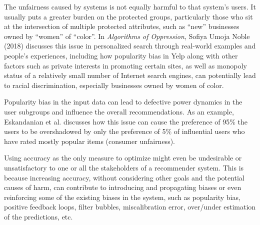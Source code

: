The unfairness caused by systems is not equally harmful to that system's users. It usually puts a greater burden on the protected groups, particularly those who sit at the intersection of multiple protected attributes, such as ``new'' businesses owned by ``women'' of ``color''. In \textit{Algorithms of Oppression}, Sofiya Umoja Noble (2018) \cite{noble2018algorithms} discusses this issue in personalized search through real-world examples and people's experiences, including how popularity bias in Yelp along with other factors such as private interests in promoting certain sites, as well as monopoly status of a relatively small number of Internet search engines, can potentially lead to racial discrimination, especially businesses owned by women of color.

Popularity bias in the input data can lead to defective power dynamics in the user subgroups and influence the overall recommendations. As an example, Eskandanian et al. \cite{Eskandanian2019power} discusses how this issue can cause the preference of 95\% the users to be overshadowed by only the preference of 5\% of influential users who have rated mostly popular items (consumer unfairness).

Using accuracy as the only measure to optimize might even be undesirable or unsatisfactory to one or all the stakeholders of a recommender system. This is because increasing accuracy, without considering other goals and the potential causes of harm, can contribute to introducing and propagating biases or even reinforcing some of the existing biases in the system, such as popularity bias, positive feedback loops, filter bubbles, miscalibration error, over/under estimation of the predictions, etc. 





